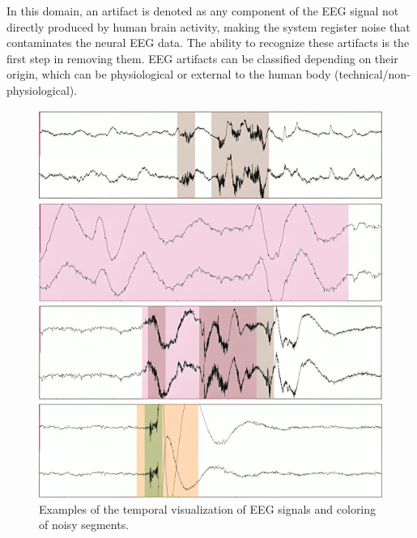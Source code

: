 \documentclass[runningheads]{llncs}
\begin{document}
In this domain, an artifact is denoted as any component of the EEG
signal not directly produced by human brain activity, making the
system register noise that contaminates the neural EEG data. The
ability to recognize these artifacts is the first step in removing
them. EEG artifacts can be classified depending on their origin, which
can be physiological or external to the human body
(technical/non-physiological).


\begin{figure}[tb]
    \centering
    \begin{minipage}[b]{0.45\textwidth}
        \centering
        \includegraphics[width=\textwidth]{images/bb1.png}     
    \end{minipage}
    \vspace{0.05cm}
    \begin{minipage}[b]{0.45\textwidth}
        \centering
        \includegraphics[width=\textwidth]{images/bb2.png}     
    \end{minipage}
    \vspace{0.05cm}
    \begin{minipage}[b]{0.45\textwidth}
        \centering
        \includegraphics[width=\textwidth]{images/bb3.png} 
    \end{minipage}
    \vspace{0.05cm}
    \begin{minipage}[b]{0.45\textwidth}
        \centering
        \includegraphics[width=\textwidth]{images/bb4.png}
    \end{minipage}
    \caption{\label{fig:Fig1} Examples of the temporal visualization of EEG signals and coloring of noisy segments.}
\end{figure}
\end{document}
